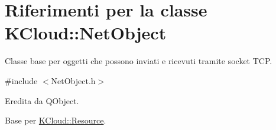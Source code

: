 \hypertarget{class_k_cloud_1_1_net_object}{\section{Riferimenti per la classe K\-Cloud\-:\-:Net\-Object}
\label{class_k_cloud_1_1_net_object}
}


Classe base per oggetti che possono inviati e ricevuti tramite socket T\-C\-P.  




{\ttfamily \#include $<$Net\-Object.\-h$>$}



Eredita da Q\-Object.



Base per \hyperlink{class_k_cloud_1_1_resource}{K\-Cloud\-::\-Resource}.


